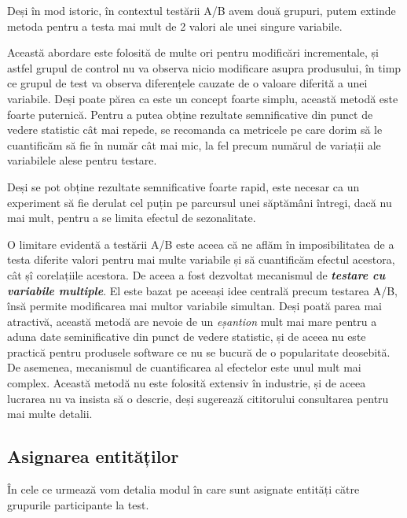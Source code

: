 \begin{remark}
	Deși în mod istoric, în contextul testării A/B avem două grupuri, putem extinde metoda pentru a testa mai mult de 2 valori ale unei singure variabile.
\end{remark}

Această abordare este folosită de multe ori pentru modificări incrementale, și astfel grupul de control nu va observa nicio modificare asupra produsului, în timp ce grupul de test va observa diferențele cauzate de o valoare diferită a unei variabile. Deși poate părea ca este un concept foarte simplu, această metodă este foarte puternică. Pentru a putea obține rezultate semnificative din punct de vedere statistic cât mai repede, se recomanda ca metricele pe care dorim să le cuantificăm să fie în număr cât mai mic, la fel precum numărul de variații ale variabilele alese pentru testare.

\begin{remark}
	Deși se pot obține rezultate semnificative foarte rapid, este necesar ca un experiment să fie derulat cel puțin pe parcursul unei săptămâni întregi, dacă nu mai mult, pentru a se limita efectul de sezonalitate.
\end{remark}

O limitare evidentă a testării A/B este aceea că ne aflăm în imposibilitatea de a testa diferite valori pentru mai multe variabile și să cuantificăm efectul acestora, cât șî corelațiile acestora. De aceea a fost dezvoltat mecanismul de \textbf{\textit{testare cu variabile multiple}}. El este bazat pe aceeași idee centrală precum testarea A/B, însă permite modificarea mai multor variabile simultan. Deși poată parea mai atractivă, această metodă are nevoie de un \textit{eșantion} mult mai mare pentru a aduna date seminificative din punct de vedere statistic, și de aceea nu este practică pentru produsele software ce nu se bucură de o popularitate deosebită. De asemenea, mecanismul de cuantificarea al efectelor este unul mult mai complex. Această metodă nu este folosită extensiv în industrie, și de aceea lucrarea nu va insista să o descrie, deși sugerează cititorului consultarea \cite{johnson1992applied} pentru mai multe detalii.

\subsection{Asignarea entităților}

În cele ce urmează vom detalia modul în care sunt asignate entități către grupurile participante la test.

